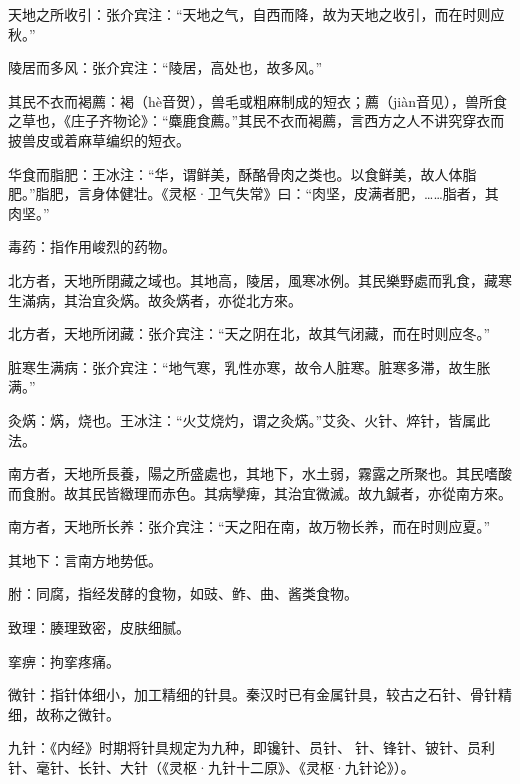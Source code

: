 \documentclass[draft,12pt]{ctexbook}
\begin{document}

\begin{jiaozhu}
  \item 天地之所收引：张介宾注：“天地之气，自西而降，故为天地之收引，而在时则应秋。”
  \item 陵居而多风：张介宾注：“陵居，高处也，故多风。”
  \item 其民不衣而褐薦：褐（hè音贺），兽毛或粗麻制成的短衣；薦（jiàn音见），兽所食之草也，《庄子齐物论》：“麋鹿食薦。”其民不衣而褐薦，言西方之人不讲究穿衣而披兽皮或着麻草编织的短衣。
  \item 华食而脂肥：王冰注：“华，谓鲜美，酥酪骨肉之类也。以食鲜美，故人体脂肥。”脂肥，言身体健壮。《灵枢·卫气失常》曰：“肉坚，皮满者肥，……脂者，其肉坚。”
  \item 毒药：指作用峻烈的药物。
\end{jiaozhu}


\begin{yuanwen}
北方者，天地所閉藏之域也。其地高，陵居，風寒冰例。其民樂野處而乳食，藏寒生滿病，其治宜灸焫。故灸焫者，亦從北方來。
\end{yuanwen}


\begin{jiaozhu}
  \item 北方者，天地所闭藏：张介宾注：“天之阴在北，故其气闭藏，而在时则应冬。”
  \item 脏寒生满病：张介宾注：“地气寒，乳性亦寒，故令人脏寒。脏寒多滞，故生胀满。”
  \item 灸焫：焫，烧也。王冰注：“火艾烧灼，谓之灸焫。”艾灸、火针、焠针，皆属此法。
\end{jiaozhu}


\begin{yuanwen}
南方者，天地所長養，陽之所盛處也，其地下，水土弱，霧露之所聚也。其民嗜酸而食胕。故其民皆緻理而赤色。其病孿痺，其治宜微滅。故九鍼者，亦從南方來。
\end{yuanwen}


\begin{jiaozhu}
  \item 南方者，天地所长养：张介宾注：“天之阳在南，故万物长养，而在时则应夏。”
  \item 其地下：言南方地势低。
  \item 胕：同腐，指经发酵的食物，如豉、鲊、曲、酱类食物。
  \item 致理：腠理致密，皮肤细腻。
  \item 挛痹：拘挛疼痛。
  \item 微针：指针体细小，加工精细的针具。秦汉时已有金属针具，较古之石针、骨针精细，故称之微针。
  \item 九针：《内经》时期将针具规定为九种，即镵针、员针、𫔂针、锋针、铍针、员利针、毫针、长针、大针（《灵枢·九针十二原》、《灵枢·九针论》）。
\end{jiaozhu}
\end{document}
